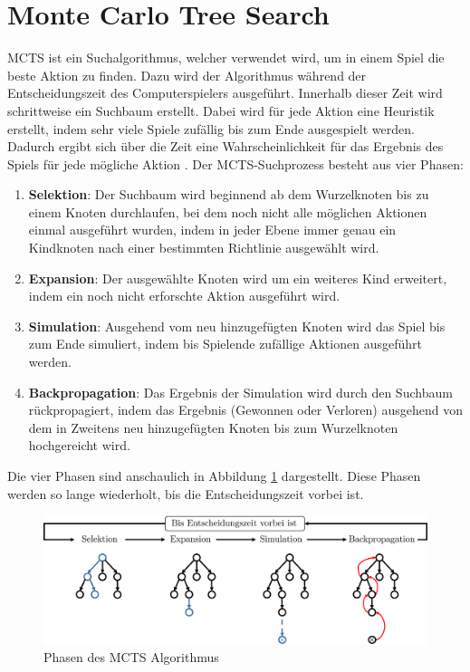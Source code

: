 \section{Monte Carlo Tree Search}
\label{chapter:monte-carlo-tree-search}

\acf{MCTS} ist ein Suchalgorithmus, welcher verwendet wird, um in einem Spiel die beste Aktion zu finden. Dazu wird der Algorithmus während der Entscheidungszeit des Computerspielers ausgeführt. Innerhalb dieser Zeit wird schrittweise ein Suchbaum erstellt. Dabei wird für jede Aktion eine Heuristik erstellt, indem sehr viele Spiele zufällig bis zum Ende ausgespielt werden. Dadurch ergibt sich über die Zeit eine Wahrscheinlichkeit für das Ergebnis des Spiels für jede mögliche Aktion \cite[S. 61]{2008.ParallelMCTS}. Der \ac{MCTS}-Suchprozess besteht aus vier Phasen:

\begin{enumerate}
    \item \textbf{Selektion}: Der Suchbaum wird beginnend ab dem Wurzelknoten bis zu einem Knoten durchlaufen, bei dem noch nicht alle möglichen Aktionen einmal ausgeführt wurden, indem in jeder Ebene immer genau ein Kindknoten nach einer bestimmten Richtlinie ausgewählt wird. \cite[S. 187]{2018.ReinforcementLearning}
    \item \textbf{Expansion}: Der ausgewählte Knoten wird um ein weiteres Kind erweitert, indem ein noch nicht erforschte Aktion ausgeführt wird. \cite[S. 61]{2008.ParallelMCTS}
    \item \textbf{Simulation}: Ausgehend vom neu hinzugefügten Knoten wird das Spiel bis zum Ende simuliert, indem bis Spielende zufällige Aktionen ausgeführt werden. \cite[S. 61]{2008.ParallelMCTS}
    \item \textbf{Backpropagation}: Das Ergebnis der Simulation wird durch den Suchbaum rückpropagiert, indem das Ergebnis (Gewonnen oder Verloren) ausgehend von dem in Zweitens neu hinzugefügten Knoten bis zum Wurzelknoten hochgereicht wird. \cite[S. 187]{2018.ReinforcementLearning}
\end{enumerate}

Die vier Phasen sind anschaulich in Abbildung \ref{fig:mcts-phases} dargestellt. Diese Phasen werden so lange wiederholt, bis die Entscheidungszeit vorbei ist.

\begin{figure}[!ht]
    \centering
    \includegraphics[width=\textwidth]{res/pictures/mcts-phases.pdf}
    \caption{Phasen des \acs{MCTS} Algorithmus}
    \label{fig:mcts-phases}
\end{figure}

